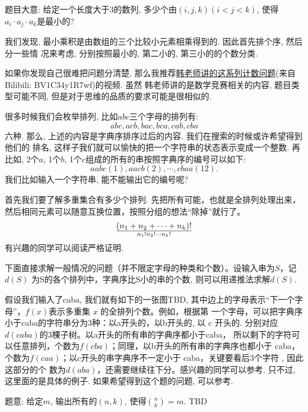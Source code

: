 题目大意: 给定一个长度大于3的数列, 多少个由$(i,j,k)(i < j < k) $, 使得$a_i\cdot a_j\cdot a_k$是最小的? 

我们发现, 最小乘积是由数组的三个比较小元素相乘得到的. 因此首先排个序, 然后分一些情
况来考虑, 分别按照最小的, 第二小的, 第三小的的个数分类. 

如果你发现自己很难把问题分清楚, 那么我推荐\href{https://www.bilibili.com/video/BV1C34y1R7wf}{韩老师讲的这系列计数问题}(来自Bilibili: BV1C34y1R7wf)的视频. 虽然
韩老师讲的是数学竞赛相关的内容, 题目类型可能不同, 但是对于思维的品质的要求可能是很相似的. 

 很多时候我们会枚举排列, 比如$abc$三个字母的排列有: 
$$
abc, acb, bac, bca, cab, cba
$$
六种. 那么, 上述的内容是字典序排序过后的内容. 我们在搜索的时候或许希望得到他们的
排名, 这样子我们就可以愉快的把一个字符串的状态表示变成一个整数. 再比如, 2个$a$, 
1个$b$, 1个$c$组成的所有的串按照字典序的编号可以如下: 
$$
aabc(1), aacb(2), \cdots, cbaa(12).
$$
我们比如输入一个字符串, 能不能输出它的编号呢? 

首先我们要了解多重集合有多少个排列. 先把所有可能，也就是全排列处理出来，
然后相同元素可以随意互换位置，按照分组的想法``除掉''就行了。
$$
(n_1+n_2+\cdots+n_k)!\over n_1!n_2!\cdots n_k!
$$
有兴趣的同学可以阅读严格证明. 

下面直接求解一般情况的问题（并不限定字母的种类和个数）。设输入串为$S$，记$d(S)$
为S的各个排列中，字典序比S小的串的个数, 则可以用递推法求解$d(S)$.

假设我们输入了caba, 我们就有如下的一张图TBD, 
其中边上的字母表示“下一个字母”，$f(x)$表示多重集 $x$ 的全排列个数。例如，根据第
一个字母，可以把字典序小于caba的字符串分为3种：以a开头的，以b开头的, 以 c 开头的.
分别对应$d(caba)$的3棵子树。以a开头的所有串的字典序都小于caba，
所以剩下的字符可以任意排列，个数为$f(cba)$；同理，以b开头的所有串的字典序也都小于 caba，
个数为$f(caa)$；以c开头的串字典序不一定小于 caba，关键要看后3个字符 , 因此这部分的个
数为$d(aba)$，还需要继续往下分。感兴趣的同学可以参考. 
只不过, 这里面的是具体的例子. 如果希望得到这个题的问题, 可以参考. 


题意: 给定$m$, 输出所有的$(n,k)$, 使得$\binom nk=m$. TBD 